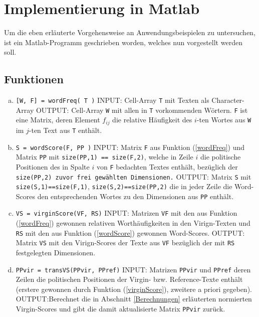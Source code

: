  
\section{Implementierung in Matlab}
Um die eben erläuterte Vorgehensweise an Anwendungsbeispielen zu untersuchen, ist ein Matlab-Programm geschrieben worden, welches nun vorgestellt werden soll.

\subsection{Funktionen}
\begin{enumerate}[(a)]
\item \label{wordFreq} \texttt{[W, F] = wordFreq( T )} \newline
      INPUT: Cell-Array \texttt{T} mit Texten als Character-Array \newline
      OUTPUT: Cell-Array \texttt{W} mit allen in \texttt{T} vorkommenden Wörtern. \texttt{F} ist eine Matrix, deren Element $f_{ij}$ die relative Häufigkeit des $i$-ten Wortes aus \texttt{W} im $j$-ten Text aus \texttt{T} enthält. 

\item \label{wordScore} \texttt{S = wordScore(F, PP )} \newline
      INPUT: Matrix \texttt{F} aus Funktion (\ref{wordFreq}) und Matrix \texttt{PP} mit \texttt{size(PP,1) == size(F,2)}, welche in Zeile $i$ die politische Positionen des in Spalte $i$ von \texttt{F} bedachten Textes enthält, bezüglich der \texttt{size(PP,2) zuvor frei gewählten Dimensionen.}  \newline
      OUTPUT: Matrix \texttt{S} mit \texttt{size(S,1)==size(F,1)}, \texttt{size(S,2)==size(PP,2)} die in jeder Zeile die Word-Scores den entsprechenden Wortes zu den Dimensionen aus \texttt{PP} enthält.
 
   
\item \label{virginScore} \texttt{VS = virginScore(VF, RS)} \newline
      INPUT: Matrizen \texttt{VF} mit den aus Funktion (\ref{wordFreq}) gewonnen relativen Worthäufigkeiten in den Virign-Texten und \texttt{RS} mit den aus Funktion (\ref{wordScore}) gewonnen Word-Scores. \newline
      OUTPUT: Matrix \texttt{VS} mit den Virign-Scores der Texte aus \texttt{VF} bezüglich der mit \texttt{RS} festgelegten Dimensionen.
   
\item \label{transVS} \texttt{PPvir = transVS(PPvir, PPref)} \newline
      INPUT: Matrizen \texttt{PPvir} und \texttt{PPref} deren Zeilen die politischen Positionen der Virgin- bzw. Reference-Texte enthält (erstere gewonnen durch Funktion (\ref{virginScore}), zweitere a priori gegeben). \newline
      OUTPUT:Berechnet die in Abschnitt \ref{Berechnungen} erläuterten normierten Virgin-Scores und gibt die damit aktualisierte Matrix \texttt{PPvir} zurück.
   

\end{enumerate}
